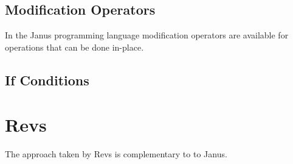 \documentclass{report}
\begin{document}
\subsection{Modification Operators}
In the Janus programming language\cite{YG:2007} modification operators are available for operations that can be done in-place.
\subsection{If Conditions}

\section{Revs}
The approach taken by Revs is complementary to to Janus.







\end{document}
